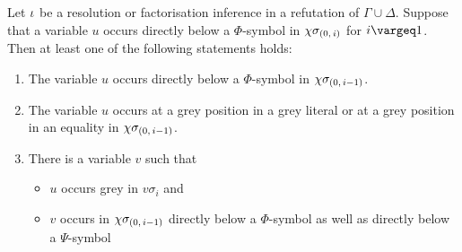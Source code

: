 \documentclass[,%
	draft=false,%
	numbers=noendperiod
	12pt,
	a4paper,
	oneside,%
	openany,
]{memoir}
\newcommand{\inv}{\ensuremath{\chi}}
\begin{document}
\begin{lemma}
	\label{lemma:var_below_phi_symbol}
	Let $\iota$ be a resolution or factorisation inference in a refutation of $\Gamma\cup\Delta$.
	Suppose that a variable $u$ occurs directly below a $\Phi$-symbol in $\inv\sigmazi$ for $i\vargeq 1$.
	Then at least one of the following statements holds:
	\begin{enumerate}
		\item
			\label{14_1}
			The variable $u$ occurs directly below a $\Phi$-symbol in $\inv\sigmazmi$.

		\item
			\label{14_4}
			The variable $u$ occurs at a grey position in a grey literal or at a grey position in an equality in $\inv\sigmazmi$.

		\item 
			\label{14_2}
			There is a variable $v$ such that 
			{
				\renewcommand{\labelitemi}{\textendash}
				\begin{itemize}
					\item $u$ occurs grey in $v\sigma_i$ and
					\item $v$ occurs in $\inv\sigmazmi$ directly below a $\Phi$-symbol as well as directly below a $\Psi$-symbol
				\end{itemize}
			}

	\end{enumerate}
\end{lemma}
\end{document}
